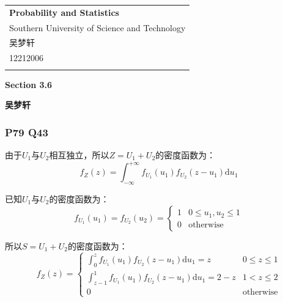 \documentclass[a4paper,12pt]{ctexart}
\begin{document}
\thispagestyle{empty} %

\begin{tabular}{p{15.5cm}}
{\large \bf Probability and Statistics} \\
Southern University of Science and Technology \\ 吴梦轩 \\ 12212006 \\
\hline
\\
\end{tabular}

\vspace*{0.3cm} %

\begin{center}
	{\Large \bf Section 3.6}
	\vspace{2mm}

	{\bf 吴梦轩}
		
\end{center}  

\vspace{0.4cm}

\subsubsection*{P79 Q43}

由于$U_1$与$U_2$相互独立，所以$Z = U_1 + U_2$的密度函数为：
\begin{equation*}
	f_Z(z) = \int_{-\infty}^{+\infty} f_{U_1}(u_1)f_{U_2}(z-u_1) \mathrm{d} u_1
\end{equation*}

已知$U_1$与$U_2$的密度函数为：
\begin{equation*}
	f_{U_1}(u_1) = f_{U_2}(u_2) = 
	\begin{cases}
		1 & 0 \leq u_1, u_2 \leq 1 \\
		0 & \text{otherwise}
	\end{cases}
\end{equation*}

所以$S = U_1 + U_2$的密度函数为：
\begin{equation*}
	f_Z(z) = 
	\begin{cases}
		\int_0^z f_{U_1}(u_1)f_{U_2}(z-u_1) \mathrm{d} u_1 = z & 0 \leq z \leq 1 \\
		\int_{z-1}^1 f_{U_1}(u_1)f_{U_2}(z-u_1) \mathrm{d} u_1 = 2-z & 1 < z \leq 2 \\
		0 & \text{otherwise}
	\end{cases}
\end{equation*}
\end{document}
